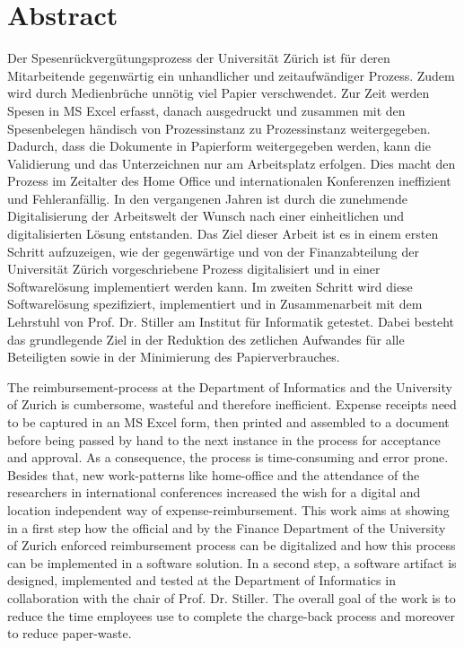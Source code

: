\chapter*{Abstract}


Der Spesenrückvergütungsprozess der Universität Zürich ist für deren Mitarbeitende gegenwärtig ein unhandlicher und zeitaufwändiger Prozess. Zudem wird durch Medienbrüche unnötig viel Papier verschwendet. Zur Zeit werden Spesen in MS Excel erfasst, danach ausgedruckt und zusammen mit den Spesenbelegen händisch von Prozessinstanz zu Prozessinstanz weitergegeben. Dadurch, dass die Dokumente in Papierform weitergegeben werden, kann die Validierung und das Unterzeichnen nur am Arbeitsplatz erfolgen. Dies macht den Prozess im Zeitalter des Home Office und internationalen Konferenzen ineffizient und Fehleranfällig. In den vergangenen Jahren ist durch die zunehmende Digitalisierung der Arbeitswelt der Wunsch nach einer einheitlichen und digitalisierten Lösung entstanden. Das Ziel dieser Arbeit ist es in einem ersten Schritt aufzuzeigen, wie der gegenwärtige und von der Finanzabteilung der Universität Zürich vorgeschriebene Prozess digitalisiert und in einer Softwarelösung implementiert werden kann. Im zweiten Schritt wird diese Softwarelösung spezifiziert, implementiert und in Zusammenarbeit mit dem Lehrstuhl von Prof. Dr. Stiller am Institut für Informatik getestet. Dabei besteht das grundlegende Ziel in der Reduktion des zetlichen Aufwandes für alle Beteiligten sowie in der Minimierung des Papierverbrauches.


The reimbursement-process at the Department of Informatics and the University of Zurich is cumbersome, wasteful and therefore inefficient. Expense receipts need to be captured in an MS Excel form, then printed and assembled to a document before being passed by hand to the next instance in the process for acceptance and approval. As a consequence, the process is time-consuming and error prone. Besides that, new work-patterns like home-office and the attendance of the researchers in international conferences increased the wish for a digital and location independent way of expense-reimbursement. This work aims at showing in a first step how the official and by the Finance Department of the University of Zurich enforced reimbursement process can be digitalized and how this process can be implemented in a software solution. In a second step, a software artifact is designed, implemented and tested at the Department of Informatics in collaboration with the chair of Prof. Dr. Stiller. The overall goal of the work is to reduce the time employees use to complete the charge-back process and moreover to reduce paper-waste.
